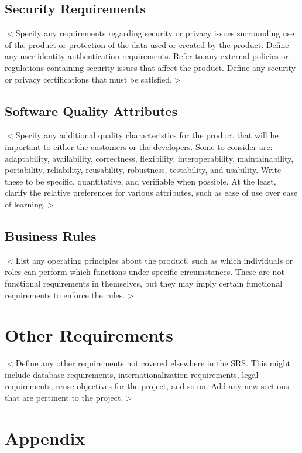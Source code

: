 \documentclass{scrreprt}
\begin{document}
\section{Security Requirements}
$<$Specify any requirements regarding security or privacy issues surrounding use 
of the product or protection of the data used or created by the product. Define 
any user identity authentication requirements. Refer to any external policies or 
regulations containing security issues that affect the product. Define any 
security or privacy certifications that must be satisfied.$>$

\section{Software Quality Attributes}
$<$Specify any additional quality characteristics for the product that will be 
important to either the customers or the developers. Some to consider are: 
adaptability, availability, correctness, flexibility, interoperability, 
maintainability, portability, reliability, reusability, robustness, testability, 
and usability. Write these to be specific, quantitative, and verifiable when 
possible. At the least, clarify the relative preferences for various attributes, 
such as ease of use over ease of learning.$>$

\section{Business Rules}
$<$List any operating principles about the product, such as which individuals or 
roles can perform which functions under specific circumstances. These are not 
functional requirements in themselves, but they may imply certain functional 
requirements to enforce the rules.$>$


\chapter{Other Requirements}
$<$Define any other requirements not covered elsewhere in the SRS. This might 
include database requirements, internationalization requirements, legal 
requirements, reuse objectives for the project, and so on. Add any new sections 
that are pertinent to the project.$>$
\appendix{}

\chapter{Appendix}
\label{cha:appendix}
\end{document}
